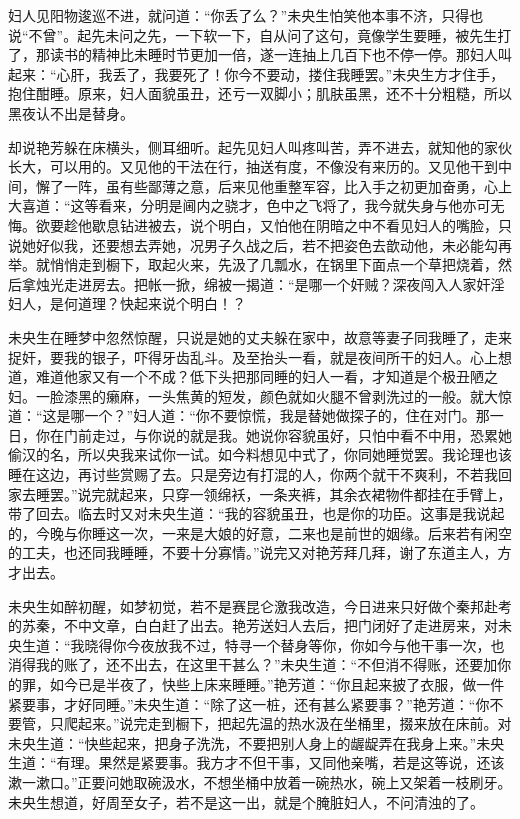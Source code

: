 \documentclass[a4paper,12pt,UTF8,twoside]{ctexbook}
\begin{document}
妇人见阳物逡巡不进，就问道：“你丢了么？”未央生怕笑他本事不济，只得也说“不曾”。起先未问之先，一下软一下，自从问了这句，竟像学生要睡，被先生打了，那读书的精神比未睡时节更加一倍，遂一连抽上几百下也不停一停。那妇人叫起来：“心肝，我丢了，我要死了！你今不要动，搂住我睡罢。”未央生方才住手，抱住酣睡。原来，妇人面貌虽丑，还亏一双脚小；肌肤虽黑，还不十分粗糙，所以黑夜认不出是替身。

却说艳芳躲在床横头，侧耳细听。起先见妇人叫疼叫苦，弄不进去，就知他的家伙长大，可以用的。又见他的干法在行，抽送有度，不像没有来历的。又见他干到中间，懈了一阵，虽有些鄙薄之意，后来见他重整军容，比入手之初更加奋勇，心上大喜道：“这等看来，分明是阃内之骁才，色中之飞将了，我今就失身与他亦可无悔。欲要趁他歇息钻进被去，说个明白，又怕他在阴暗之中不看见妇人的嘴脸，只说她好似我，还要想去弄她，况男子久战之后，若不把姿色去歆动他，未必能勾再举。就悄悄走到橱下，取起火来，先汲了几瓢水，在锅里下面点一个草把烧着，然后拿烛光走进房去。把帐一掀，绵被一揭道：“是哪一个奸贼？深夜闯入人家奸淫妇人，是何道理？快起来说个明白！？

未央生在睡梦中忽然惊醒，只说是她的丈夫躲在家中，故意等妻子同我睡了，走来捉奸，要我的银子，吓得牙齿乱斗。及至抬头一看，就是夜间所干的妇人。心上想道，难道他家又有一个不成？低下头把那同睡的妇人一看，才知道是个极丑陋之妇。一脸漆黑的癞麻，一头焦黄的短发，颜色就如火腿不曾剥洗过的一般。就大惊道：“这是哪一个？”妇人道：“你不要惊慌，我是替她做探子的，住在对门。那一日，你在门前走过，与你说的就是我。她说你容貌虽好，只怕中看不中用，恐累她偷汉的名，所以央我来试你一试。如今料想见中式了，你同她睡觉罢。我论理也该睡在这边，再讨些赏赐了去。只是旁边有打混的人，你两个就干不爽利，不若我回家去睡罢。”说完就起来，只穿一领绵袄，一条夹裤，其余衣裙物件都挂在手臂上，带了回去。临去时又对未央生道：“我的容貌虽丑，也是你的功臣。这事是我说起的，今晚与你睡这一次，一来是大娘的好意，二来也是前世的姻缘。后来若有闲空的工夫，也还同我睡睡，不要十分寡情。”说完又对艳芳拜几拜，谢了东道主人，方才出去。

未央生如醉初醒，如梦初觉，若不是赛昆仑激我改造，今日进来只好做个秦邦赴考的苏秦，不中文章，白白赶了出去。艳芳送妇人去后，把门闭好了走进房来，对未央生道：“我晓得你今夜放我不过，特寻一个替身等你，你如今与他干事一次，也消得我的账了，还不出去，在这里干甚么？”未央生道：“不但消不得账，还要加你的罪，如今已是半夜了，快些上床来睡睡。”艳芳道：“你且起来披了衣服，做一件紧要事，才好同睡。”未央生道：“除了这一桩，还有甚么紧要事？”艳芳道：“你不要管，只爬起来。”说完走到橱下，把起先温的热水汲在坐桶里，掇来放在床前。对未央生道：“快些起来，把身子洗洗，不要把别人身上的龌龊弄在我身上来。”未央生道：“有理。果然是紧要事。我方才不但干事，又同他亲嘴，若是这等说，还该漱一漱口。”正要问她取碗汲水，不想坐桶中放着一碗热水，碗上又架着一枝刷牙。未央生想道，好周至女子，若不是这一出，就是个腌脏妇人，不问清浊的了。
\end{document}
